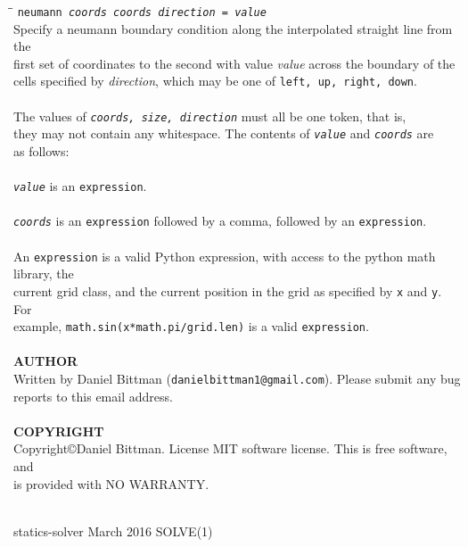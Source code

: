 \begin{tabbing}
\hspace{30pt}\=\hspace{30pt}\=\kill
	\> \texttt{neumann \textit{coords} \textit{coords} \textit{direction} = \textit{value}}\\
	\> \> Specify a neumann boundary condition along the interpolated straight line from the\\
	\> \> first set of coordinates to the second with value \textit{value} across the boundary of the\\
	\> \> cells specified by \textit{direction}, which may be one of \texttt{left, up, right, down}.\\
	\\
	\> The values of \texttt{\textit{coords, size, direction}} must all be one token, that is,\\
	\> they may not contain any whitespace. The contents of \texttt{\textit{value}} and \texttt{\textit{coords}} are\\
	\> as follows:\\
	\\
	\> \texttt{\textit{value}} is an \texttt{expression}.\\
	\\
	\> \texttt{\textit{coords}} is an \texttt{expression} followed by a comma, followed by an \texttt{expression}.\\
	\\
	An \texttt{expression} is a valid Python expression, with access to the python math library, the\\
	current grid class, and the current position in the grid as specified by \texttt{x} and \texttt{y}. For \\
	example, \texttt{math.sin(x*math.pi/grid.len)} is a valid \texttt{expression}.\\
	\\
	\textbf{AUTHOR}\\
	\> Written by Daniel Bittman (\texttt{danielbittman1@gmail.com}). Please submit any bug\\
	\> reports to this email address.\\
	\\
	\textbf{COPYRIGHT}\\
	\> Copyright\copyright Daniel Bittman. License MIT software license. This is free software, and\\
	\> is provided with NO WARRANTY.\\
	\\

\end{tabbing}
\begin{flushleft}
	statics-solver
	\hfill March 2016 \hfill
	SOLVE(1)
\end{flushleft}

